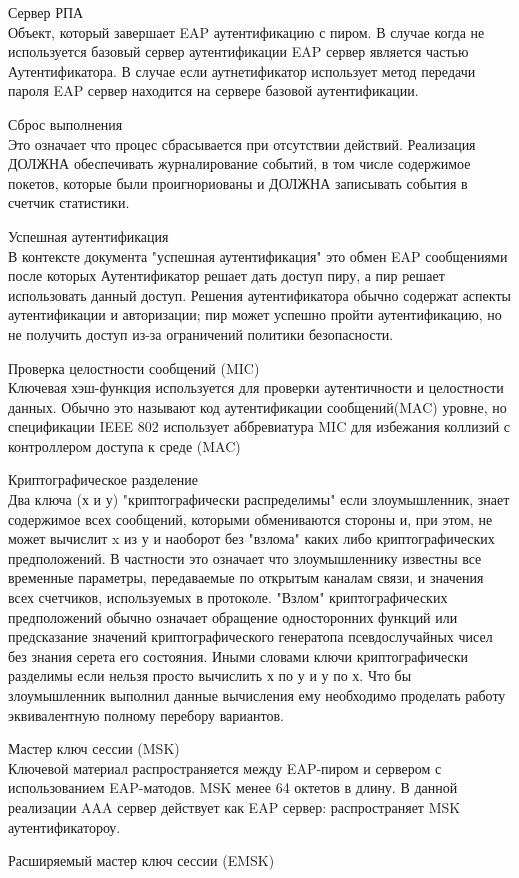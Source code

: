 Сервер РПА \\ Объект, который завершает EAP аутентификацию с пиром. В случае когда не используется базовый сервер аутентификации EAP сервер является частью Аутентификатора. В случае если аутнетификатор использует метод передачи пароля EAP сервер находится на сервере базовой аутентификации.

Сброс выполнения \\ Это означает что процес сбрасывается при отсутствии действий. Реализация ДОЛЖНА обеспечивать журналирование событий, в том числе содержимое покетов, которые были проигнориованы и ДОЛЖНА записывать события в счетчик статистики.

Успешная аутентификация \\ В контексте документа "успешная аутентификация" это обмен EAP сообщениями после которых Аутентификатор решает дать доступ пиру, а пир решает использовать данный доступ. Решения аутентификатора обычно содержат аспекты аутентификации и авторизации; пир может успешно пройти аутентификацию, но не получить доступ из-за ограничений политики безопасности.

Проверка целостности сообщений (MIC) \\ Ключевая хэш-функция используется для проверки аутентичности и целостности данных. Обычно это называют код аутентификации сообщений(MAC) уровне, но спецификации IEEE 802 использует аббревиатура MIC для избежания коллизий с контроллером доступа к среде (MAC)

Криптографическое разделение \\ Два ключа (х и у) "криптографически распределимы" если злоумышленник, знает содержимое всех сообщений, которыми обмениваются стороны и, при этом, не может вычислит x из у и наоборот без "взлома" каких либо криптографических предположений. В частности это означает что злоумышленнику известны все временные параметры, передаваемые по открытым каналам связи, и значения всех счетчиков, используемых в протоколе. "Взлом" криптографических предположений обычно означает обращение односторонних функций или предсказание значений криптографического генератопа псевдослучайных чисел без знания серета его состояния. Иными словами ключи криптографически разделимы если нельзя просто вычислить х по у и у по х. Что бы злоумышленник выполнил данные вычисления ему необходимо проделать работу эквивалентную полному перебору вариантов.

Мастер ключ сессии (MSK) \\ Ключевой материал распространяется между EAP-пиром и сервером с использованием EAP-матодов. MSK менее 64 октетов в длину. В данной реализации AAA сервер действует как EAP сервер: распространяет MSK аутентификатороу.

Расширяемый мастер ключ сессии (EMSK) \\ 
